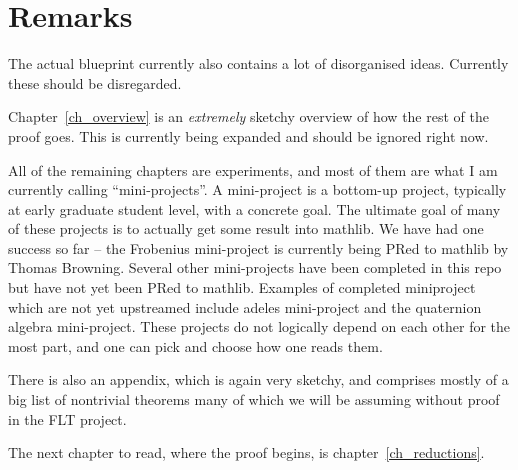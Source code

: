 \section{Remarks}

The actual blueprint currently also contains a lot of disorganised ideas. Currently these
should be disregarded.

Chapter~\ref{ch_overview} is an \emph{extremely} sketchy overview of how
the rest of the proof goes. This is currently being expanded and should be ignored
right now.

All of the remaining chapters are experiments, and most of them are what I am currently
calling ``mini-projects''. A mini-project is a bottom-up project, typically at early graduate
student level, with a concrete goal. The ultimate goal of many of these projects is to actually
get some result into mathlib. We have had one success so far -- the Frobenius mini-project
is currently being PRed to mathlib by Thomas Browning. Several other mini-projects have
been completed in this repo but have not yet been PRed to mathlib. Examples of completed
miniproject which are not yet upstreamed include adeles
mini-project and the quaternion algebra mini-project. These projects do not logically depend
on each other for the most part, and one can pick and choose how one reads them.

There is also an appendix, which is again very sketchy, and comprises mostly of a big
list of nontrivial theorems many of which we will be assuming without proof in the FLT
project.

The next chapter to read, where the proof begins, is chapter~\ref{ch_reductions}.
